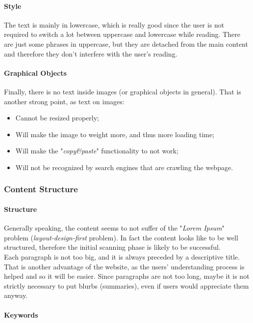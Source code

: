 \paragraph{Style}
The text is mainly in lowercase, which is really good since the user is not required to switch a lot between uppercase and lowercase while reading. There are just some phrases in uppercase, but they are detached from the main content and therefore they don't interfere with the user's reading.

\paragraph{Graphical Objects}
Finally, there is no text inside images (or graphical objects in general). That is another strong point, as text on images:
\begin{itemize}
\item Cannot be resized properly;
\item Will make the image to weight more, and thus more loading time;
\item Will make the "\textit{copy\&paste}" functionality to not work;
\item Will not be recognized by search engines that are crawling the webpage.
\end{itemize}

\subsubsection{Content Structure}
\paragraph{Structure}
Generally speaking, the content seems to not suffer of the "\textit{Lorem Ipsum}" problem (\textit{layout-design-first} problem). In fact the content looks like to be well structured, therefore the initial scanning phase is likely to be successful.\\
Each paragraph is not too big, and it is always preceded by a descriptive title. That is another advantage of the website, as the users' understanding process is helped and so it will be easier. Since paragraphs are not too long, maybe it is not strictly necessary to put blurbs (summaries), even if users would appreciate them anyway.

\paragraph{Keywords}

